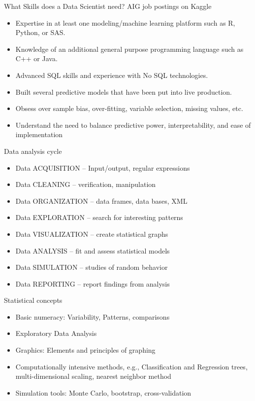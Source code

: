 \documentclass{beamer}\usepackage[]{graphicx}\usepackage[]{color}
\theoremstyle{mystyle}
\begin{document}
\begin{frame}{What Skills does a Data Scientist need?}
AIG job postings on Kaggle
\begin{itemize}
\item Expertise in at least one modeling/machine learning platform such as R, Python, or SAS. 
\item Knowledge of an additional general purpose programming language such as C++ or Java. 
\item Advanced SQL skills and experience with No SQL technologies.
\item Built several predictive models that have been put into live production. 
\item Obsess over sample bias, over-fitting, variable selection, missing values, etc.
\item Understand the need to balance predictive power, interpretability, and ease of implementation
\end{itemize}
\end{frame}

\begin{frame}{Data analysis cycle}
\begin{itemize}
\item Data ACQUISITION – Input/output, regular expressions 
\item Data CLEANING – verification, manipulation
\item Data ORGANIZATION – data frames, data bases, XML
\item Data EXPLORATION – search for interesting patterns
\item Data VISUALIZATION – create statistical graphs
\item Data ANALYSIS – fit and assess statistical models 
\item Data SIMULATION – studies of random behavior
\item Data REPORTING – report findings from analysis
\end{itemize}
\end{frame}

\begin{frame}{Statistical concepts}
\begin{itemize}
\item Basic numeracy: Variability, Patterns, comparisons
\item Exploratory Data Analysis
\item Graphics: Elements and principles of graphing 
\item Computationally intensive methods, e.g.,
Classification and Regression trees, multi-dimensional scaling, nearest neighbor method
\item Simulation tools: Monte Carlo, bootstrap, cross-validation
\end{itemize}
\end{frame}
\end{document}
